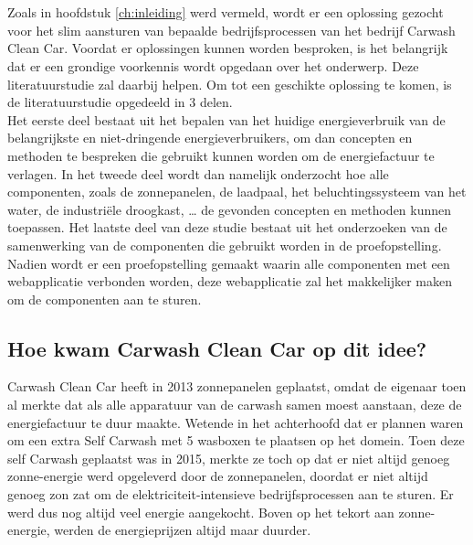 \chapter{}%
\label{ch:stand-van-zaken}



Zoals in hoofdstuk \ref{ch:inleiding} werd vermeld, wordt er een oplossing gezocht voor het slim aansturen van bepaalde bedrijfsprocessen van het bedrijf Carwash Clean Car. Voordat er oplossingen kunnen worden besproken, is het belangrijk dat er een grondige voorkennis wordt opgedaan over het onderwerp. Deze literatuurstudie zal daarbij helpen. Om tot een geschikte oplossing te komen, is de literatuurstudie opgedeeld in 3 delen.\\

Het eerste deel bestaat uit het bepalen van het huidige energieverbruik van de belangrijkste en niet-dringende energieverbruikers, om dan concepten en methoden te bespreken die gebruikt kunnen worden om de energiefactuur te verlagen. In het tweede deel wordt dan namelijk onderzocht hoe alle componenten, zoals de zonnepanelen, de laadpaal, het beluchtingssysteem van het water, de industriële droogkast, … de gevonden concepten en methoden kunnen toepassen. Het laatste deel van deze studie bestaat uit het onderzoeken van de samenwerking van de componenten die gebruikt worden in de proefopstelling.\\

Nadien wordt er een proefopstelling gemaakt waarin alle componenten met een webapplicatie verbonden worden, deze webapplicatie zal het makkelijker maken om de componenten aan te sturen.

\section{Hoe kwam Carwash Clean Car op dit idee?}
\label{sec:stand-van-zaken-idee}

Carwash Clean Car heeft in 2013 zonnepanelen geplaatst, omdat de eigenaar toen al merkte dat als alle apparatuur van de carwash samen moest aanstaan, deze de energiefactuur te duur maakte. Wetende in het achterhoofd dat er plannen waren om een extra Self Carwash met 5 wasboxen te plaatsen op het domein. Toen deze self Carwash geplaatst was in 2015, merkte ze toch op dat er niet altijd genoeg zonne-energie werd opgeleverd door de zonnepanelen, doordat er niet altijd genoeg zon zat om de elektriciteit-intensieve bedrijfsprocessen aan te sturen. Er werd dus nog altijd veel energie aangekocht. Boven op het tekort aan zonne-energie, werden de energieprijzen altijd maar duurder.\\


